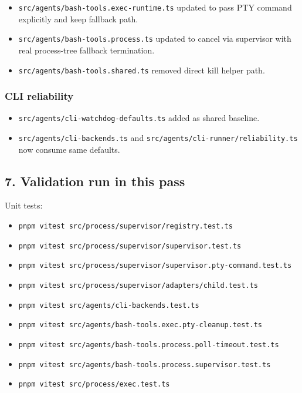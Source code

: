 \begin{itemize}
  \item \texttt{src/agents/bash-tools.exec-runtime.ts} updated to pass PTY command explicitly and keep fallback path.
  \item \texttt{src/agents/bash-tools.process.ts} updated to cancel via supervisor with real process-tree fallback termination.
  \item \texttt{src/agents/bash-tools.shared.ts} removed direct kill helper path.
\end{itemize}


\subsubsection{CLI reliability}


\begin{itemize}
  \item \texttt{src/agents/cli-watchdog-defaults.ts} added as shared baseline.
  \item \texttt{src/agents/cli-backends.ts} and \texttt{src/agents/cli-runner/reliability.ts} now consume same defaults.
\end{itemize}


\subsection{7. Validation run in this pass}


Unit tests:

\begin{itemize}
  \item \texttt{pnpm vitest src/process/supervisor/registry.test.ts}
  \item \texttt{pnpm vitest src/process/supervisor/supervisor.test.ts}
  \item \texttt{pnpm vitest src/process/supervisor/supervisor.pty-command.test.ts}
  \item \texttt{pnpm vitest src/process/supervisor/adapters/child.test.ts}
  \item \texttt{pnpm vitest src/agents/cli-backends.test.ts}
  \item \texttt{pnpm vitest src/agents/bash-tools.exec.pty-cleanup.test.ts}
  \item \texttt{pnpm vitest src/agents/bash-tools.process.poll-timeout.test.ts}
  \item \texttt{pnpm vitest src/agents/bash-tools.process.supervisor.test.ts}
  \item \texttt{pnpm vitest src/process/exec.test.ts}
\end{itemize}


